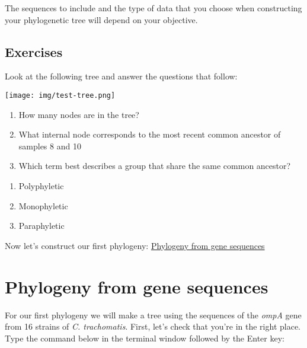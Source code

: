 \documentclass[11pt]{article}
\providecommand{\tightlist}{%
      \setlength{\itemsep}{0pt}\setlength{\parskip}{0pt}}
\begin{document}
The sequences to include and the type of data that you choose when
constructing your phylogenetic tree will depend on your objective.

    \hypertarget{exercises}{%
\subsection{Exercises}\label{exercises}}

Look at the following tree and answer the questions that follow:


\begin{center}
\texttt{[image: img/test-tree.png]}
\end{center}


\begin{enumerate}
\def\labelenumi{\arabic{enumi}.}
\tightlist
\item
  How many nodes are in the tree?
\item
  What internal node corresponds to the most recent common ancestor of
  samples 8 and 10
\item
  Which term best describes a group that share the same common ancestor?
\end{enumerate}

\begin{enumerate}
\def\labelenumi{\alph{enumi}.}
\tightlist
\item
  Polyphyletic
\item
  Monophyletic
\item
  Paraphyletic
\end{enumerate}

    Now let's construct our first phylogeny: \href{gene.ipynb}{Phylogeny
from gene sequences}





\newpage





    \hypertarget{phylogeny-from-gene-sequences}{%
\section{Phylogeny from gene
sequences}\label{phylogeny-from-gene-sequences}}

For our first phylogeny we will make a tree using the sequences of the
\textit{ompA} gene from 16 strains of \textit{C. trachomatis}. First, let's
check that you're in the right place. Type the command below in the
terminal window followed by the Enter key:
\end{document}
